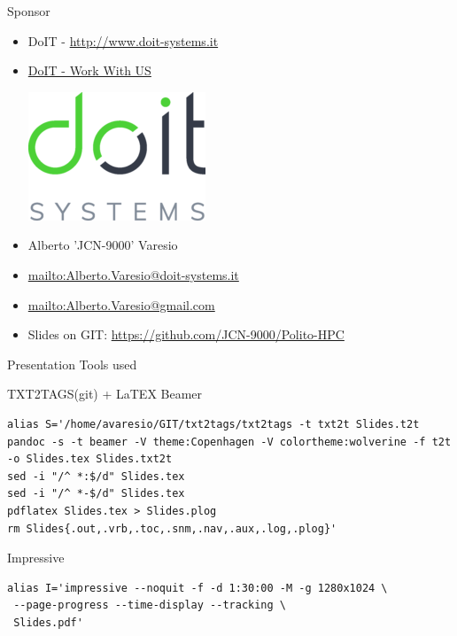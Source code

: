 \documentclass[ignorenonframetext,]{beamer}
\providecommand{\tightlist}{%
  \setlength{\itemsep}{0pt}\setlength{\parskip}{0pt}}
\begin{document}
\begin{frame}{Sponsor}

\begin{itemize}
\item
  DoIT - \href{http://www.doit-systems.it/}{http://www.doit-systems.it}
\item
  \href{http://www.doit-systems.it/EN_lavoraconnoi.html}{DoIT - Work
  With US}

  \includegraphics{images/DoIT.png}
\item
  Alberto 'JCN-9000' Varesio
\item
  \href{Alberto.Varesio@doit-systems.it}{mailto:Alberto.Varesio@doit-systems.it}
\item
  \href{Alberto.Varesio@gmail.com}{mailto:Alberto.Varesio@gmail.com}
\end{itemize}


\begin{itemize}
\tightlist
\item
  Slides on GIT: \url{https://github.com/JCN-9000/Polito-HPC}
\end{itemize}


\end{frame}

\begin{frame}[fragile]{Presentation Tools used}

\begin{block}{TXT2TAGS(git) + LaTEX Beamer}

\begin{verbatim}
alias S='/home/avaresio/GIT/txt2tags/txt2tags -t txt2t Slides.t2t
pandoc -s -t beamer -V theme:Copenhagen -V colortheme:wolverine -f t2t -o Slides.tex Slides.txt2t
sed -i "/^ *:$/d" Slides.tex
sed -i "/^ *-$/d" Slides.tex
pdflatex Slides.tex > Slides.plog
rm Slides{.out,.vrb,.toc,.snm,.nav,.aux,.log,.plog}'
\end{verbatim}

\end{block}

\begin{block}{Impressive}

\begin{verbatim}
alias I='impressive --noquit -f -d 1:30:00 -M -g 1280x1024 \
 --page-progress --time-display --tracking \
 Slides.pdf'
\end{verbatim}

\end{block}

\end{frame}
\end{document}
